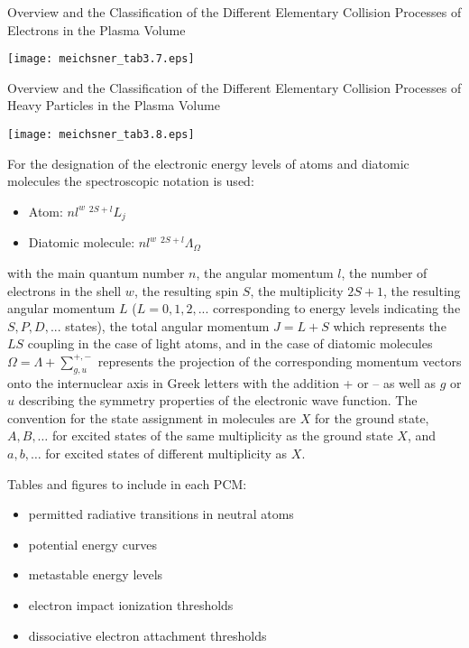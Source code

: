 \begin{table}
\caption{Overview and the Classification of the Different Elementary Collision
Processes of Electrons in the Plasma Volume}
\texttt{[image: meichsner\_tab3.7.eps]}
\end{table}

\begin{table}
\caption{Overview and the Classification of the Different Elementary Collision
Processes of Heavy Particles in the Plasma Volume}
\texttt{[image: meichsner\_tab3.8.eps]}
\end{table}

For the designation of the electronic energy levels of atoms and diatomic
molecules the spectroscopic notation is used:\\

\begin{itemize}
\item Atom: $nl^w\; {}^{2S+l}L_j$\\
\item Diatomic molecule: $nl^w\; {}^{2S+l}\Lambda_\Omega$
\end{itemize}
 
with the main quantum number $n$, the angular momentum $l$, the number of electrons
in the shell $w$, the resulting spin $S$, the multiplicity $2S + 1$, the resulting angular
momentum $L$ ($L = 0, 1, 2,...$ corresponding to energy levels indicating the $S, P, D,. . .$ 
states), the total angular momentum $J = L+S$ which represents the  $LS$ coupling in
the case of light atoms, and in the case of diatomic molecules  $\Omega =\Lambda + \sum_{g,u}^{+,-}$ represents
the projection of the corresponding momentum vectors onto the internuclear axis in
Greek letters with the addition + or – as well as $g$ or $u$ describing the symmetry
properties of the electronic wave function. The convention for the state assignment in
molecules are $X$ for the ground state, $A, B,\ldots$ for excited states of the same multiplicity
as the ground state $X$, and $a, b,\ldots$ for excited states of different multiplicity as $X$.

Tables and figures to include in each PCM:

\begin{itemize}
\item permitted radiative transitions in neutral atoms
\item potential energy curves
\item metastable energy levels
\item electron impact ionization thresholds
\item dissociative electron attachment thresholds
\end{itemize}

